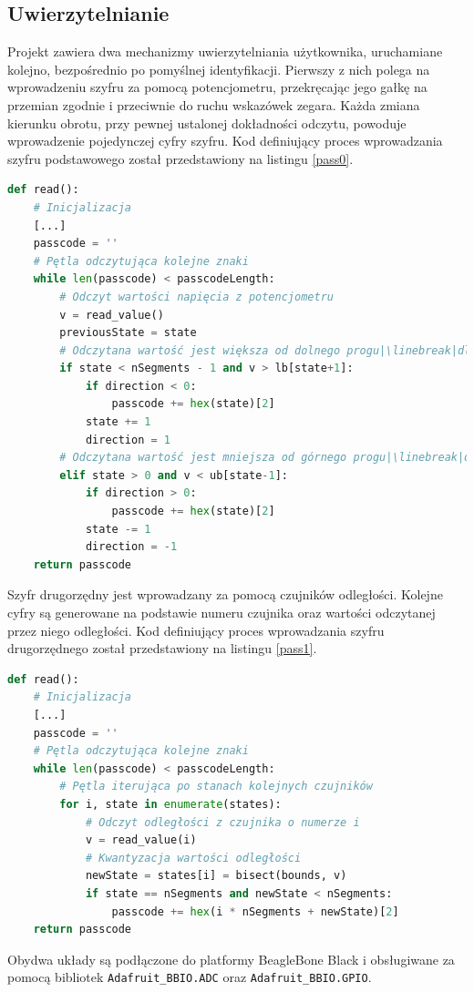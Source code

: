 \documentclass[polish,polish,a4paper]{article}
\begin{document}
	\subsection{Uwierzytelnianie}
	Projekt zawiera dwa mechanizmy uwierzytelniania użytkownika, uruchamiane kolejno, bezpośrednio po pomyślnej identyfikacji. Pierwszy z nich polega na wprowadzeniu szyfru za pomocą potencjometru, przekręcając jego gałkę na przemian zgodnie i przeciwnie do ruchu wskazówek zegara. Każda zmiana kierunku obrotu, przy pewnej ustalonej dokładności odczytu, powoduje wprowadzenie pojedynczej cyfry szyfru. Kod definiujący proces wprowadzania szyfru podstawowego został przedstawiony na listingu \ref{pass0}.
	\begin{lstlisting}[language=Python, caption={Fragment kodu sterującego wprowadzaniem szyfru podstawowego}, label=pass0]
def read():
	# Inicjalizacja
	[...]
	passcode = ''
	# Pętla odczytująca kolejne znaki
	while len(passcode) < passcodeLength:
		# Odczyt wartości napięcia z potencjometru
		v = read_value()
		previousState = state
		# Odczytana wartość jest większa od dolnego progu|\linebreak|dla cyfry większej o 1
		if state < nSegments - 1 and v > lb[state+1]:
			if direction < 0:
				passcode += hex(state)[2]
			state += 1
			direction = 1
		# Odczytana wartość jest mniejsza od górnego progu|\linebreak|dla cyfry mniejszej o 1
		elif state > 0 and v < ub[state-1]:
			if direction > 0:
				passcode += hex(state)[2]
			state -= 1
			direction = -1
	return passcode
	\end{lstlisting}
	Szyfr drugorzędny jest wprowadzany za pomocą czujników odległości. Kolejne cyfry są generowane na podstawie numeru czujnika oraz wartości odczytanej przez niego odległości. Kod definiujący proces wprowadzania szyfru drugorzędnego został przedstawiony na listingu \ref{pass1}.
	\begin{lstlisting}[language=Python, caption={Fragment kodu sterującego wprowadzaniem szyfru drugorzędnego}, label=pass1]
def read():
	# Inicjalizacja
	[...]
	passcode = ''
	# Pętla odczytująca kolejne znaki
	while len(passcode) < passcodeLength:
		# Pętla iterująca po stanach kolejnych czujników
		for i, state in enumerate(states):
			# Odczyt odległości z czujnika o numerze i
			v = read_value(i)
			# Kwantyzacja wartości odległości
			newState = states[i] = bisect(bounds, v)
			if state == nSegments and newState < nSegments:
				passcode += hex(i * nSegments + newState)[2]
	return passcode
	\end{lstlisting}
	Obydwa układy są podłączone do platformy BeagleBone Black i obsługiwane za pomocą bibliotek \linebreak\verb|Adafruit_BBIO.ADC| oraz \verb|Adafruit_BBIO.GPIO|.
	
\end{document}

